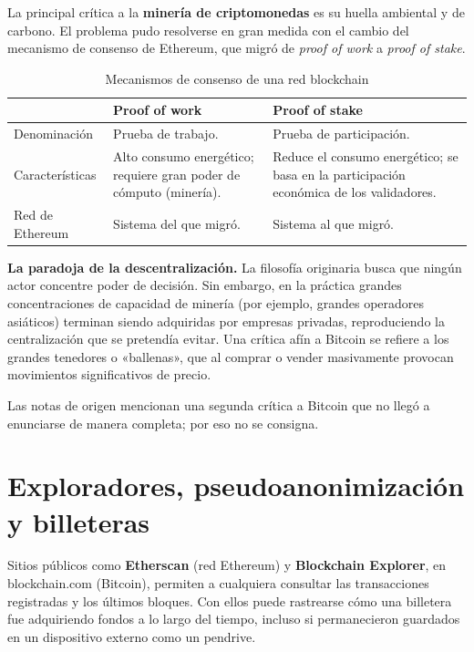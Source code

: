 \documentclass[12pt,oneside]{book}
\begin{document}
La principal crítica a la \textbf{minería de criptomonedas} es su huella ambiental y de carbono. El problema pudo resolverse en gran medida con el cambio del mecanismo de consenso de Ethereum, que migró de \emph{proof of work} a \emph{proof of stake}.

\begin{table}[H]
\centering
\caption{Mecanismos de consenso de una red blockchain}
\renewcommand{\arraystretch}{1.2}
\begin{tabularx}{\textwidth}{>{\raggedright\arraybackslash}p{}XX}
\toprule
& \textbf{Proof of work} & \textbf{Proof of stake} \\
\midrule
Denominación & Prueba de trabajo. & Prueba de participación. \\
Características & Alto consumo energético; requiere gran poder de cómputo (minería). & Reduce el consumo energético; se basa en la participación económica de los validadores. \\
Red de Ethereum & Sistema del que migró. & Sistema al que migró. \\
\bottomrule
\end{tabularx}
\end{table}

\begin{important}
\textbf{La paradoja de la descentralización.} La filosofía originaria busca que ningún actor concentre poder de decisión. Sin embargo, en la práctica grandes concentraciones de capacidad de minería (por ejemplo, grandes operadores asiáticos) terminan siendo adquiridas por empresas privadas, reproduciendo la centralización que se pretendía evitar. Una crítica afín a Bitcoin se refiere a los grandes tenedores o «ballenas», que al comprar o vender masivamente provocan movimientos significativos de precio.
\end{important}

\begin{note}
Las notas de origen mencionan una segunda crítica a Bitcoin que no llegó a enunciarse de manera completa; por eso no se consigna.
\end{note}

\section{Exploradores, pseudoanonimización y billeteras}

Sitios públicos como \textbf{Etherscan} (red Ethereum) y \textbf{Blockchain Explorer}, en blockchain.com (Bitcoin), permiten a cualquiera consultar las transacciones registradas y los últimos bloques. Con ellos puede rastrearse cómo una billetera fue adquiriendo fondos a lo largo del tiempo, incluso si permanecieron guardados en un dispositivo externo como un pendrive.
\end{document}
